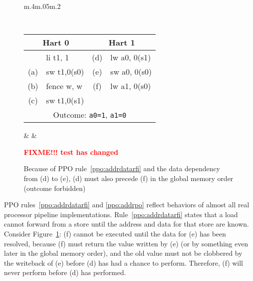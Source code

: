 \begin{figure}[h!]
  \centering
  \begin{tabular}{m{.4\linewidth}m{.05\linewidth}m{.2\linewidth}}
  {
    \tt\small
    \begin{tabular}{cl||cl}
    \multicolumn{2}{c}{Hart 0} & \multicolumn{2}{c}{Hart 1} \\
    \hline
          & li t1, 1    & (d) & lw a0, 0(s1)   \\
      (a) & sw t1,0(s0) & (e) & sw a0, 0(s0)   \\
      (b) & fence w, w  & (f) & lw a1, 0(s0)   \\
      (c) & sw t1,0(s1) &     &                \\
      \hline
      \multicolumn{4}{c}{Outcome: {\tt a0=1}, {\tt a1=0}}
    \end{tabular}
  } & &
  
  \textcolor{red}{\bf FIXME!!! test has changed}
  \end{tabular}

  \caption{Because of PPO rule~\ref{ppo:addrdatarfi} and the data dependency from (d) to (e), (d) must also precede (f) in the global memory order (outcome forbidden)}
  \label{fig:litmus:addrdatarfi}
\end{figure}

PPO rules~\ref{ppo:addrdatarfi} and \ref{ppo:addrpo} reflect behaviors of almost all real processor pipeline implementations.
Rule~\ref{ppo:addrdatarfi} states that a load cannot forward from a store until the address and data for that store are known.
Consider Figure~\ref{fig:litmus:addrdatarfi}:
(f) cannot be executed until the data for (e) has been resolved, because (f) must return the value written by (e) (or by something even later in the global memory order), and the old value must not be clobbered by the writeback of (e) before (d) has had a chance to perform.
Therefore, (f) will never perform before (d) has performed.

